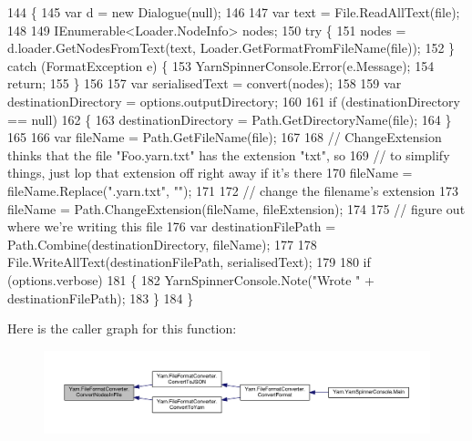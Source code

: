 \begin{DoxyCode}
144         \{
145             var d = \textcolor{keyword}{new} Dialogue(null);
146 
147             var text = File.ReadAllText(file);
148 
149             IEnumerable<Loader.NodeInfo> nodes;
150             \textcolor{keywordflow}{try} \{
151                 nodes = d.loader.GetNodesFromText(text, Loader.GetFormatFromFileName(file));
152             \} \textcolor{keywordflow}{catch} (FormatException e) \{
153                 YarnSpinnerConsole.Error(e.Message);
154                 \textcolor{keywordflow}{return};
155             \}
156 
157             var serialisedText = convert(nodes);
158 
159             var destinationDirectory = options.outputDirectory;
160 
161             \textcolor{keywordflow}{if} (destinationDirectory == null)
162             \{
163                 destinationDirectory = Path.GetDirectoryName(file);
164             \}
165 
166             var fileName = Path.GetFileName(file);
167 
168             \textcolor{comment}{// ChangeExtension thinks that the file "Foo.yarn.txt" has the extension "txt", so}
169             \textcolor{comment}{// to simplify things, just lop that extension off right away if it's there}
170             fileName = fileName.Replace(\textcolor{stringliteral}{".yarn.txt"}, \textcolor{stringliteral}{""});
171 
172             \textcolor{comment}{// change the filename's extension}
173             fileName = Path.ChangeExtension(fileName, fileExtension);
174 
175             \textcolor{comment}{// figure out where we're writing this file}
176             var destinationFilePath = Path.Combine(destinationDirectory, fileName);
177 
178             File.WriteAllText(destinationFilePath, serialisedText);
179 
180             \textcolor{keywordflow}{if} (options.verbose)
181             \{
182                 YarnSpinnerConsole.Note(\textcolor{stringliteral}{"Wrote "} + destinationFilePath);
183             \}
184         \}
\end{DoxyCode}


Here is the caller graph for this function\-:
\nopagebreak
\begin{figure}[H]
\begin{center}
\leavevmode
\includegraphics[width=350pt]{a00095_aa72838be584177b5592c31d73c0febdb_icgraph}
\end{center}
\end{figure}


